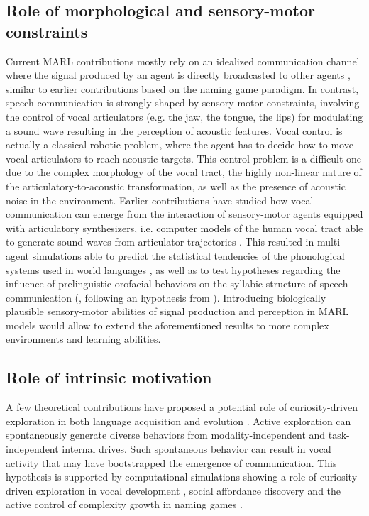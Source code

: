 \documentclass[letterpaper]{article} %
\begin{document}
\subsection{Role of morphological and sensory-motor constraints}
Current MARL contributions mostly rely on an idealized communication channel where the signal produced by an agent is directly broadcasted to other agents \cite{Sukhbaatar2016,Mordatch2017,foerster2016learning}, similar to earlier contributions based on the naming game paradigm. In contrast, speech communication is strongly shaped by sensory-motor constraints, involving the control of vocal articulators (e.g. the jaw, the tongue, the lips) for modulating a sound wave resulting in the perception of acoustic features. Vocal control is actually a classical robotic problem, where the agent has to decide how to move vocal articulators to reach acoustic targets. This control problem is a difficult one due to the complex morphology of the vocal tract, the highly non-linear nature of the articulatory-to-acoustic transformation, as well as the presence of acoustic noise in the environment. Earlier contributions have studied how vocal communication can emerge from the interaction of sensory-motor agents equipped with articulatory synthesizers, i.e. computer models of the human vocal tract able to generate sound waves from articulator trajectories \cite{moulinfrier2015cosmo,Moulin-Frier_Frontiers_2013}. This resulted in multi-agent simulations able to predict the statistical tendencies of the phonological systems used in world languages \cite{Oudeyer2005}, as well as to test hypotheses regarding the influence of prelinguistic orofacial behaviors on the syllabic structure of speech communication (\cite{moulinfrier2015cosmo}, following an hypothesis from \cite{macneilage98}). Introducing biologically plausible sensory-motor abilities of signal production and perception in MARL models would allow to extend the aforementioned results to more complex environments and learning abilities. 


\subsection{Role of intrinsic motivation}
A few theoretical contributions have proposed a potential role of curiosity-driven exploration in both language acquisition \cite{Oller2000} and evolution \cite{oudeyer_smith_evo_devo}. Active exploration can spontaneously generate diverse behaviors from modality-independent and task-independent internal drives. Such spontaneous behavior can result in vocal activity that may have bootstrapped the emergence of communication. This hypothesis is supported by computational simulations showing a role of curiosity-driven exploration in vocal development \cite{Moulin-Frier_Frontiers_2013}, social affordance discovery \cite{Oudeyer2006} and the active control of complexity growth in naming games \cite{schueller2015active}.
\end{document}

